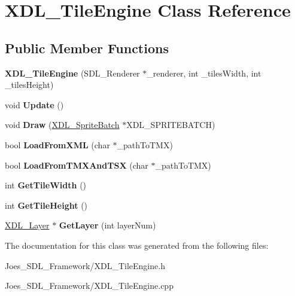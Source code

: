 \hypertarget{class_x_d_l___tile_engine}{\section{X\-D\-L\-\_\-\-Tile\-Engine Class Reference}
\label{class_x_d_l___tile_engine}
}
\subsection*{Public Member Functions}
\begin{DoxyCompactItemize}
\item 
\hypertarget{class_x_d_l___tile_engine_a98bee762bf2317a9835fe08d43c72d3e}{{\bfseries X\-D\-L\-\_\-\-Tile\-Engine} (S\-D\-L\-\_\-\-Renderer $\ast$\-\_\-renderer, int \-\_\-tiles\-Width, int \-\_\-tiles\-Height)}\label{class_x_d_l___tile_engine_a98bee762bf2317a9835fe08d43c72d3e}

\item 
\hypertarget{class_x_d_l___tile_engine_a09b4b351ebcb85a637c6324eca20f7ae}{void {\bfseries Update} ()}\label{class_x_d_l___tile_engine_a09b4b351ebcb85a637c6324eca20f7ae}

\item 
\hypertarget{class_x_d_l___tile_engine_ab92e4ccf7272df6acf32ae144de0f07b}{void {\bfseries Draw} (\hyperlink{class_x_d_l___sprite_batch}{X\-D\-L\-\_\-\-Sprite\-Batch} $\ast$X\-D\-L\-\_\-\-S\-P\-R\-I\-T\-E\-B\-A\-T\-C\-H)}\label{class_x_d_l___tile_engine_ab92e4ccf7272df6acf32ae144de0f07b}

\item 
\hypertarget{class_x_d_l___tile_engine_a768bab50a988a2bb6f329709fb57f5ce}{bool {\bfseries Load\-From\-X\-M\-L} (char $\ast$\-\_\-path\-To\-T\-M\-X)}\label{class_x_d_l___tile_engine_a768bab50a988a2bb6f329709fb57f5ce}

\item 
\hypertarget{class_x_d_l___tile_engine_a8f6d9ab1bd0bb21d403cde2e5980cb9d}{bool {\bfseries Load\-From\-T\-M\-X\-And\-T\-S\-X} (char $\ast$\-\_\-path\-To\-T\-M\-X)}\label{class_x_d_l___tile_engine_a8f6d9ab1bd0bb21d403cde2e5980cb9d}

\item 
\hypertarget{class_x_d_l___tile_engine_acc054aba7cc81238b2101f562fdeaeed}{int {\bfseries Get\-Tile\-Width} ()}\label{class_x_d_l___tile_engine_acc054aba7cc81238b2101f562fdeaeed}

\item 
\hypertarget{class_x_d_l___tile_engine_a5c7c48bcfc59c2e0c5c03dad43c52d7a}{int {\bfseries Get\-Tile\-Height} ()}\label{class_x_d_l___tile_engine_a5c7c48bcfc59c2e0c5c03dad43c52d7a}

\item 
\hypertarget{class_x_d_l___tile_engine_aab7ccf749e184493f526bbdab9a22f96}{\hyperlink{class_x_d_l___layer}{X\-D\-L\-\_\-\-Layer} $\ast$ {\bfseries Get\-Layer} (int layer\-Num)}\label{class_x_d_l___tile_engine_aab7ccf749e184493f526bbdab9a22f96}

\end{DoxyCompactItemize}


The documentation for this class was generated from the following files\-:\begin{DoxyCompactItemize}
\item 
Joes\-\_\-\-S\-D\-L\-\_\-\-Framework/X\-D\-L\-\_\-\-Tile\-Engine.\-h\item 
Joes\-\_\-\-S\-D\-L\-\_\-\-Framework/X\-D\-L\-\_\-\-Tile\-Engine.\-cpp\end{DoxyCompactItemize}
